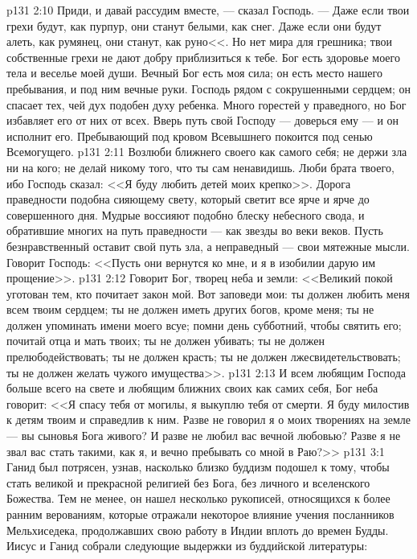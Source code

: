 \vs p131 2:10 Приди, и давай рассудим вместе, --- сказал Господь. --- Даже если твои грехи будут, как пурпур, они станут белыми, как снег. Даже если они будут алеть, как румянец, они станут, как руно<<. Но нет мира для грешника; твои собственные грехи не дают добру приблизиться к тебе. Бог есть здоровье моего тела и веселье моей души. Вечный Бог есть моя сила; он есть место нашего пребывания, и под ним вечные руки. Господь рядом с сокрушенными сердцем; он спасает тех, чей дух подобен духу ребенка. Много горестей у праведного, но Бог избавляет его от них от всех. Вверь путь свой Господу --- доверься ему --- и он исполнит его. Пребывающий под кровом Всевышнего покоится под сенью Всемогущего.
\vs p131 2:11 Возлюби ближнего своего как самого себя; не держи зла ни на кого; не делай никому того, что ты сам ненавидишь. Люби брата твоего, ибо Господь сказал: <<Я буду любить детей моих крепко>>. Дорога праведности подобна сияющему свету, который светит все ярче и ярче до совершенного дня. Мудрые воссияют подобно блеску небесного свода, и обратившие многих на путь праведности --- как звезды во веки веков. Пусть безнравственный оставит свой путь зла, а неправедный --- свои мятежные мысли. Говорит Господь: <<Пусть они вернутся ко мне, и я в изобилии дарую им прощение>>.
\vs p131 2:12 Говорит Бог, творец неба и земли: <<Великий покой уготован тем, кто почитает закон мой. Вот заповеди мои: ты должен любить меня всем твоим сердцем; ты не должен иметь других богов, кроме меня; ты не должен упоминать имени моего всуе; помни день субботний, чтобы святить его; почитай отца и мать твоих; ты не должен убивать; ты не должен прелюбодействовать; ты не должен красть; ты не должен лжесвидетельствовать; ты не должен желать чужого имущества>>.
\vs p131 2:13 И всем любящим Господа больше всего на свете и любящим ближних своих как самих себя, Бог неба говорит: <<Я спасу тебя от могилы, я выкуплю тебя от смерти. Я буду милостив к детям твоим и справедлив к ним. Разве не говорил я о моих творениях на земле --- вы сыновья Бога живого? И разве не любил вас вечной любовью? Разве я не звал вас стать такими, как я, и вечно пребывать со мной в Раю?>>
\vs p131 3:1 Ганид был потрясен, узнав, насколько близко буддизм подошел к тому, чтобы стать великой и прекрасной религией без Бога, без личного и вселенского Божества. Тем не менее, он нашел несколько рукописей, относящихся к более ранним верованиям, которые отражали некоторое влияние учения посланников Мельхиседека, продолжавших свою работу в Индии вплоть до времен Будды. Иисус и Ганид собрали следующие выдержки из буддийской литературы:
